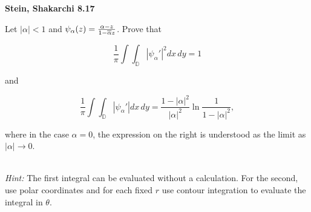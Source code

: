 \textbf{Stein, Shakarchi 8.17}

Let $|\alpha| < 1$ and $\psi_{\alpha}(z) = \frac{\alpha - z}{1 - \overline{\alpha} z}$. Prove that 

$$
\frac{1}{\pi} \int\int_{\mathbb{D}} \left| \psi_{\alpha}' \right|^2 dx \, dy = 1
$$

and 

$$
\frac{1}{\pi} \int\int_{\mathbb{D}} \left| \psi_{\alpha}' \right| dx \, dy = \frac{1 - |\alpha|^2}{|\alpha|^2} \ln{\frac{1}{1 - |\alpha|^2}},
$$

where in the case $\alpha = 0$, the expression on the right is understood as the limit as $|\alpha| \to 0$.

\ \\
\textit{Hint:} The first integral can be evaluated without a calculation. For the second, use polar coordinates and for
each fixed $r$ use contour integration to evaluate the integral in $\theta$.

